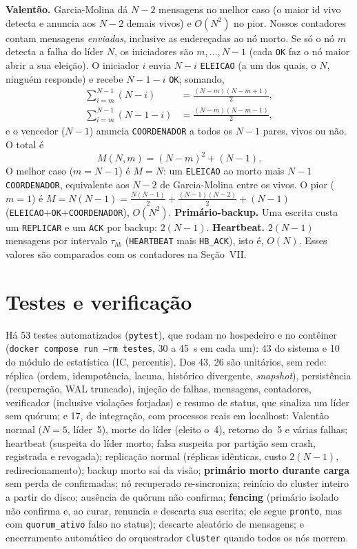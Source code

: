 \documentclass[conference,a4paper]{IEEEtran}
\begin{document}
\textbf{Valentão.} Garcia-Molina \cite{garcia1982} dá $N-2$
mensagens no melhor caso (o maior id vivo detecta e anuncia aos $N-2$ demais
vivos) e $O(N^2)$ no pior. Nossos contadores contam mensagens
\emph{enviadas}, inclusive as endereçadas ao nó morto. Se só o nó $m$ detecta
a falha do líder $N$, os iniciadores são $m,\dots,N-1$ (cada \texttt{OK}
faz o nó maior abrir a sua eleição). O iniciador $i$ envia $N-i$
\texttt{ELEICAO} (a um dos quais, o $N$, ninguém responde) e recebe $N-1-i$
\texttt{OK}; somando,
\begin{align}
 \textstyle\sum_{i=m}^{N-1}(N-i)&=\tfrac{(N-m)(N-m+1)}{2},\nonumber\\
 \textstyle\sum_{i=m}^{N-1}(N-1-i)&=\tfrac{(N-m)(N-m-1)}{2},\nonumber
\end{align}
e o vencedor ($N-1$) anuncia \texttt{COORDENADOR} a todos os $N-1$ pares,
vivos ou não. O total é
\begin{equation}
 M(N,m)=(N-m)^2+(N-1).
 \label{eq:bully}
\end{equation}
O melhor caso ($m=N-1$) é $M=N$: um \texttt{ELEICAO} ao morto mais $N-1$
\texttt{COORDENADOR}, equivalente aos $N-2$ de Garcia-Molina entre os vivos.
O pior ($m=1$) é $M=N(N-1)=\tfrac{N(N-1)}{2}+\tfrac{(N-1)(N-2)}{2}+(N-1)$
(\texttt{ELEICAO}+\texttt{OK}+\texttt{COORDENADOR}), $O(N^2)$.
\textbf{Primário-backup.} Uma escrita custa um \texttt{REPLICAR} e um
\texttt{ACK} por backup: $2(N-1)$. \textbf{Heartbeat.} $2(N-1)$ mensagens por
intervalo $\tau_{hb}$ (\texttt{HEARTBEAT} mais \texttt{HB\_ACK}), isto é,
$O(N)$. Esses valores são comparados com os contadores na Seção~VII.

\section{Testes e verificação}

Há 53 testes automatizados (\texttt{pytest}), que rodam no hospedeiro e no
contêiner (\texttt{docker compose run --rm testes}, 30 a 45~s em
cada um): 43 do sistema e 10 do módulo de estatística (IC, percentis). Dos 43, 26 são unitários,
sem rede: réplica (ordem, idempotência, lacuna, histórico divergente,
\emph{snapshot}), persistência (recuperação, WAL truncado), injeção de falhas,
mensagens, contadores, verificador (inclusive violações forjadas) e resumo de
status, que sinaliza um líder sem quórum; e 17, de integração, com processos
reais em localhost: Valentão normal ($N=5$, líder~5), morte do líder (eleito
o~4), retorno do~5 e várias falhas; heartbeat (suspeita do líder morto; falsa
suspeita por partição sem crash, registrada e revogada); replicação normal
(réplicas idênticas, custo $2(N-1)$, redirecionamento); backup morto sai da
visão; \textbf{primário morto durante carga} sem perda de confirmadas; nó
recuperado re-sincroniza; reinício do cluster inteiro a partir do disco;
ausência de quórum não confirma; \textbf{fencing} (primário isolado não
confirma e, ao curar, renuncia e descarta sua escrita; ele segue
\texttt{pronto}, mas com \texttt{quorum\_ativo} falso no status); descarte
aleatório de mensagens; e encerramento automático do orquestrador
\texttt{cluster} quando todos os nós morrem.
\end{document}
